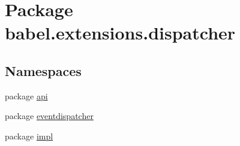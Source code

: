 \hypertarget{namespacebabel_1_1extensions_1_1dispatcher}{\section{Package babel.\-extensions.\-dispatcher}
\label{namespacebabel_1_1extensions_1_1dispatcher}
}
\subsection*{Namespaces}
\begin{DoxyCompactItemize}
\item 
package \hyperlink{namespacebabel_1_1extensions_1_1dispatcher_1_1api}{api}
\item 
package \hyperlink{namespacebabel_1_1extensions_1_1dispatcher_1_1eventdispatcher}{eventdispatcher}
\item 
package \hyperlink{namespacebabel_1_1extensions_1_1dispatcher_1_1impl}{impl}
\end{DoxyCompactItemize}
